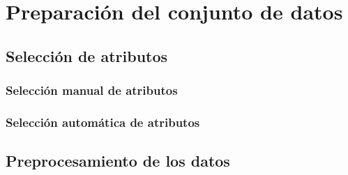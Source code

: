 \chapter{Preparación del conjunto de datos}

\section{Selección de atributos}

\subsection{Selección manual de atributos}

\subsection{Selección automática de atributos}

\section{Preprocesamiento de los datos}
